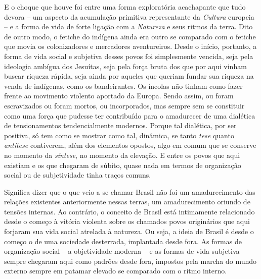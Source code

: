 E o choque que houve foi entre uma forma exploratória acachapante que
tudo devora -- um aspecto da acumulação primitiva representante da
\emph{Cultura} europeia -- e a forma de vida de forte ligação com a
\emph{Natureza} e seus ritmos da terra. Dito de outro modo, o fetiche do
indígena ainda era outro se comparado com o fetiche que movia os
colonizadores e mercadores aventureiros. Desde o início, portanto, a
forma de vida social e subjetiva desses povos foi simplesmente vencida,
seja pela ideologia ambígua dos Jesuítas, seja pela força bruta dos que
por aqui vinham buscar riqueza rápida, seja ainda por aqueles que
queriam fundar sua riqueza na venda de indígenas, como os bandeirantes.
Os íncolas não tinham como fazer frente ao movimento violento aportado
da Europa. Sendo assim, ou foram escravizados ou foram mortos, ou
incorporados, mas sempre sem se constituir como uma força que pudesse
ter contribuído para o amadurecer de uma dialética de tensionamentos
tendencialmente modernos. Porque tal dialética, por ser positiva, só tem
como se mostrar como tal, dinâmica, se tanto \emph{tese} quanto
\emph{antítese} contiverem, além dos elementos opostos, algo em comum
que se conserve no momento da \emph{síntese}, no momento da elevação. E
entre os povos que aqui existiam e os que chegaram de súbito, quase nada
em termos de organização social ou de subjetividade tinha traços comuns.

Significa dizer que o que veio a se chamar Brasil não foi um
amadurecimento das relações existentes anteriormente nessas terras, um
amadurecimento oriundo de tensões internas. Ao contrário, o conceito de
Brasil está intimamente relacionado desde o começo à vitória violenta
sobre os chamados povos originários que aqui forjaram sua vida social
atrelada à natureza. Ou seja, a ideia de Brasil é desde o começo o de
uma sociedade desterrada, implantada desde fora. As formas de
organização social -- a objetividade moderna -- e as formas de vida
subjetiva sempre chegaram aqui como padrões desde fora, impostos pela
marcha do mundo externo sempre em patamar elevado se comparado com o
ritmo interno.

